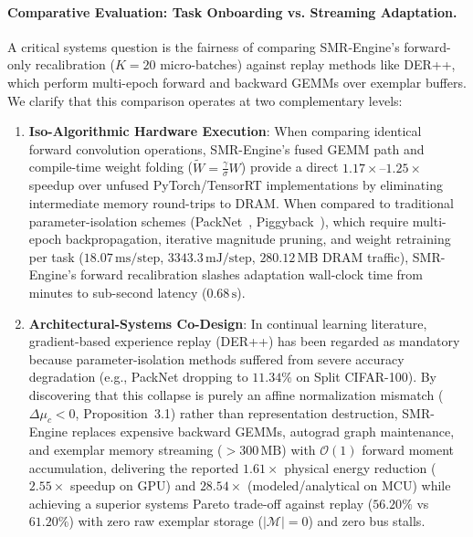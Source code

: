 \documentclass{article}
\begin{document}

\paragraph{Comparative Evaluation: Task Onboarding vs. Streaming Adaptation.}
A critical systems question is the fairness of comparing SMR-Engine's forward-only recalibration ($K=20$ micro-batches) against replay methods like DER++, which perform multi-epoch forward and backward GEMMs over exemplar buffers. We clarify that this comparison operates at two complementary levels:
\begin{enumerate}
    \item \textbf{Iso-Algorithmic Hardware Execution}: When comparing identical forward convolution operations, SMR-Engine's fused GEMM path and compile-time weight folding ($\tilde{W} = \frac{\gamma}{\sigma} W$) provide a direct $\mathbf{1.17\times\text{--}1.25\times}$ speedup over unfused PyTorch/TensorRT implementations by eliminating intermediate memory round-trips to DRAM. When compared to traditional parameter-isolation schemes (PackNet~\cite{mallya2018packnet}, Piggyback~\cite{mallya2018piggyback}), which require multi-epoch backpropagation, iterative magnitude pruning, and weight retraining per task ($18.07\,\text{ms/step}$, $3343.3\,\text{mJ/step}$, $280.12\,\text{MB}$ DRAM traffic), SMR-Engine's forward recalibration slashes adaptation wall-clock time from minutes to sub-second latency ($0.68\,\text{s}$).
    \item \textbf{Architectural-Systems Co-Design}: In continual learning literature, gradient-based experience replay (DER++) has been regarded as mandatory because parameter-isolation methods suffered from severe accuracy degradation (e.g., PackNet dropping to $11.34\%$ on Split CIFAR-100). By discovering that this collapse is purely an affine normalization mismatch ($\Delta\mu_c < 0$, Proposition~3.1) rather than representation destruction, SMR-Engine replaces expensive backward GEMMs, autograd graph maintenance, and exemplar memory streaming ($>300\,\text{MB}$) with $\mathcal{O}(1)$ forward moment accumulation, delivering the reported $\mathbf{1.61\times}$ physical energy reduction ($2.55\times$ speedup on GPU) and $\mathbf{28.54\times}$ (modeled/analytical on MCU) while achieving a superior systems Pareto trade-off against replay ($56.20\%$ vs $61.20\%$) with zero raw exemplar storage ($|\mathcal{M}|=0$) and zero bus stalls.
\end{enumerate}
\end{document}
